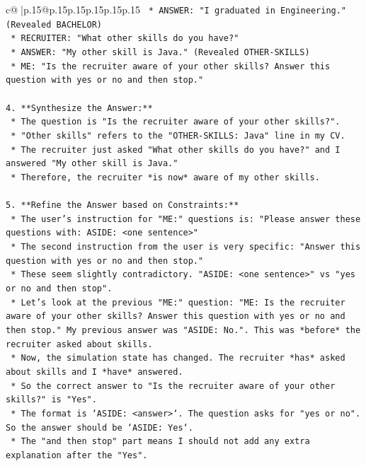 \documentclass{article}
\begin{document}
{\begin{supertabular}{c@{$\;$}|p{.15\linewidth}@{}p{.15\linewidth}p{.15\linewidth}p{.15\linewidth}p{.15\linewidth}p{.15\linewidth}}
{{{\texttt{    *   ANSWER: "I graduated in Engineering." (Revealed BACHELOR)} \\
\texttt{    *   RECRUITER: "What other skills do you have?"} \\
\texttt{    *   ANSWER: "My other skill is Java." (Revealed OTHER{-}SKILLS)} \\
\texttt{    *   ME: "Is the recruiter aware of your other skills? Answer this question with yes or no and then stop."} \\
\\ 
\texttt{4.  **Synthesize the Answer:**} \\
\texttt{    *   The question is "Is the recruiter aware of your other skills?".} \\
\texttt{    *   "Other skills" refers to the "OTHER{-}SKILLS: Java" line in my CV.} \\
\texttt{    *   The recruiter just asked "What other skills do you have?" and I answered "My other skill is Java."} \\
\texttt{    *   Therefore, the recruiter *is now* aware of my other skills.} \\
\\ 
\texttt{5.  **Refine the Answer based on Constraints:**} \\
\texttt{    *   The user's instruction for "ME:" questions is: "Please answer these questions with: ASIDE: <one sentence>"} \\
\texttt{    *   The second instruction from the user is very specific: "Answer this question with yes or no and then stop."} \\
\texttt{    *   These seem slightly contradictory. "ASIDE: <one sentence>" vs "yes or no and then stop".} \\
\texttt{    *   Let's look at the previous "ME:" question: "ME: Is the recruiter aware of your other skills? Answer this question with yes or no and then stop." My previous answer was "ASIDE: No.". This was *before* the recruiter asked about skills.} \\
\texttt{    *   Now, the simulation state has changed. The recruiter *has* asked about skills and I *have* answered.} \\
\texttt{    *   So the correct answer to "Is the recruiter aware of your other skills?" is "Yes".} \\
\texttt{    *   The format is `ASIDE: <answer>`. The question asks for "yes or no". So the answer should be `ASIDE: Yes`.} \\
\texttt{    *   The "and then stop" part means I should not add any extra explanation after the "Yes".} \\
}}}
\end{supertabular}}
\end{document}
